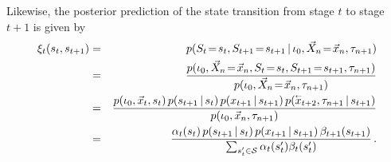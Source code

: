 \documentclass[a4paper]{article}
\newcommand{\rvec}[1]{\accentset{\leftarrow}{#1}}
\begin{document}
Likewise, the posterior prediction of the state transition from stage $t$ to stage $t+1$ is given by
\begin{eqnarray}
\xi_t(s_t,s_{t+1}) & = &
   p(S_t\!=\!s_t,S_{t+1}\!=\!s_{t+1}\,|\,\iota_0,\vec{X}_n\!=\!\vec{x}_n,\tau_{n+1})
\nonumber\\& = & 
\frac{p(\iota_0,\vec{X}_n\!=\!\vec{x}_n,S_t\!=\!s_t,S_{t+1}\!=\!s_{t+1},\tau_{n+1})}
        {p(\iota_0,\vec{X}_n\!=\!\vec{x}_n,\tau_{n+1})}
\nonumber\\& = & 
\frac{p(\iota_0,\vec{x}_t,s_t)\,p(s_{t+1}\,|\,s_t)\,p(x_{t+1}\,|\,s_{t+1})\,p(\rvec{x}_{t+2},\tau_{n+1}\,|\,s_{t+1})}
        {p(\iota_0,\vec{x}_n,\tau_{n+1})}
\nonumber\\& = & 
\frac{\alpha_t(s_t)\,p(s_{t+1}\,|\,s_t)\,p(x_{t+1}\,|\,s_{t+1})\,\beta_{t+1}(s_{t+1})}
        {\sum_{s_t'\in{\cal S}}\alpha_t(s_t')\beta_t(s_t')}
\,.
\end{eqnarray}

\end{document}
